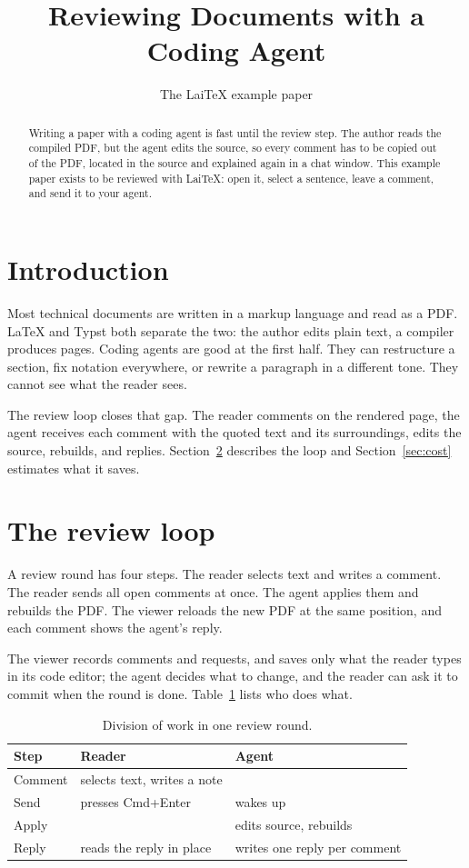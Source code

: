 \documentclass[11pt]{article}
\title{Reviewing Documents with a Coding Agent}
\author{The LaiTeX example paper}
\date{}
\begin{document}
\maketitle

\begin{abstract}
Writing a paper with a coding agent is fast until the review step. The author reads the
compiled PDF, but the agent edits the source, so every comment has to be copied out of the
PDF, located in the source and explained again in a chat window. This example paper exists
to be reviewed with LaiTeX: open it, select a sentence, leave a comment, and send it to
your agent.
\end{abstract}

\section{Introduction}
\label{sec:intro}

Most technical documents are written in a markup language and read as a PDF. LaTeX
\cite{lamport1994latex} and Typst \cite{typst} both separate the two: the author edits
plain text, a compiler produces pages. Coding agents are good at the first half. They can
restructure a section, fix notation everywhere, or rewrite a paragraph in a different tone.
They cannot see what the reader sees.

The review loop closes that gap. The reader comments on the rendered page, the agent
receives each comment with the quoted text and its surroundings, edits the source,
rebuilds, and replies. Section~\ref{sec:loop} describes the loop and
Section~\ref{sec:cost} estimates what it saves.

\section{The review loop}
\label{sec:loop}

A review round has four steps. The reader selects text and writes a comment. The reader
sends all open comments at once. The agent applies them and rebuilds the PDF. The viewer
reloads the new PDF at the same position, and each comment shows the agent's reply.

The viewer records comments and requests, and saves only what the reader types in its code
editor; the agent decides what to change, and the reader can ask it to commit when the round
is done.
Table~\ref{tab:roles} lists who does what.

\begin{table}[h]
\centering
\begin{tabular}{lll}
\toprule
Step & Reader & Agent \\
\midrule
Comment & selects text, writes a note & \\
Send & presses Cmd+Enter & wakes up \\
Apply & & edits source, rebuilds \\
Reply & reads the reply in place & writes one reply per comment \\
\bottomrule
\end{tabular}
\caption{Division of work in one review round.}
\label{tab:roles}
\end{table}
\end{document}
